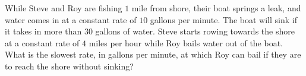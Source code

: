 While Steve and Roy are fishing $1$ mile from shore, their boat springs a leak, and water comes in at a constant rate of $10$ gallons per minute. The boat will sink if it takes in more than $30$ gallons of water. Steve starts rowing towards the shore at a constant rate of $4$ miles per hour while Roy bails water out of the boat. What is the slowest rate, in gallons per minute, at which Roy can bail if they are to reach the shore without sinking?
